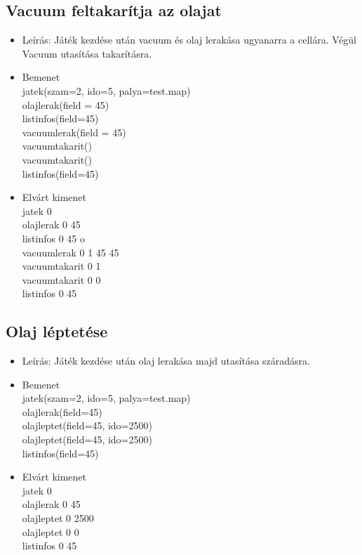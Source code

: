 \subsection{Vacuum feltakarítja az olajat}
\begin{itemize}
	\item Leírás: Játék kezdése után vacuum és olaj lerakása ugyanarra a cellára. Végül Vacuum utasítása takarításra.
		\item Bemenet\\
		jatek(szam=2, ido=5, palya=test.map) \\
		olajlerak(field = 45) \\
		listinfos(field=45) \\		
		vacuumlerak(field = 45) \\
		vacuumtakarit() \\
		vacuumtakarit() \\		
		listinfos(field=45) \\
	\item Elvárt kimenet\\
		jatek 0 \\ 
		olajlerak 0 45 \\ 
		listinfos 0 45 o \\
		vacuumlerak 0 1 45 45 \\ 
		vacuumtakarit 0 1 \\ 
		vacuumtakarit 0 0 \\ 
		listinfos 0 45 \\
\end{itemize}

\subsection{Olaj léptetése}
\begin{itemize}
	\item Leírás: Játék kezdése után olaj lerakása majd utasítása száradásra.
	\item Bemenet\\
		jatek(szam=2, ido=5, palya=test.map) \\
		olajlerak(field=45) \\
		olajleptet(field=45, ido=2500) \\
		olajleptet(field=45, ido=2500) \\				
		listinfos(field=45) \\
	\item Elvárt kimenet\\
		jatek 0 \\
		olajlerak 0 45 \\ 
		olajleptet 0 2500 \\ 
		olajleptet 0 0 \\
		listinfos 0 45 \\		
\end{itemize}

